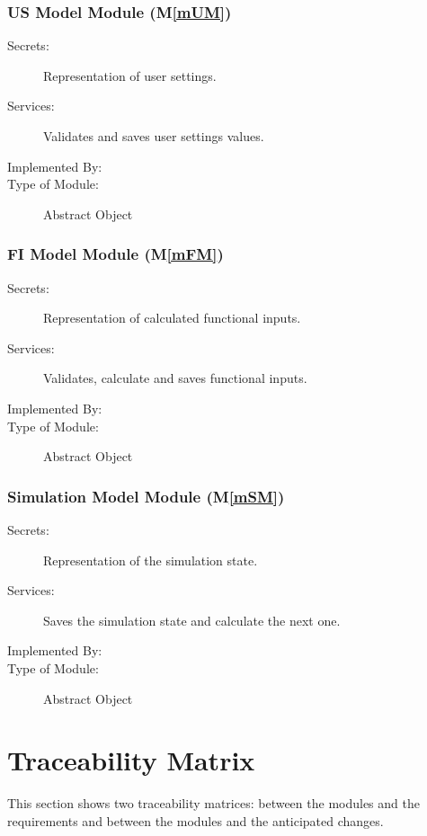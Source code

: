 \documentclass[12pt, titlepage]{article}
\newcommand{\mref}[1]{M\ref{#1}}
\begin{document}
\subsubsection{US Model Module (\mref{mUM})}

\begin{description}
\item[Secrets:]Representation of user settings.
\item[Services:]Validates and saves user settings values.
\item[Implemented By:] \progname
\item[Type of Module:] Abstract Object
\end{description}

\subsubsection{FI Model Module (\mref{mFM})}

\begin{description}
\item[Secrets:]Representation of calculated functional inputs.
\item[Services:]Validates, calculate and saves functional inputs.
\item[Implemented By:] \progname
\item[Type of Module:] Abstract Object
\end{description}

\subsubsection{Simulation Model Module (\mref{mSM})}

\begin{description}
\item[Secrets:]Representation of the simulation state.
\item[Services:]Saves the simulation state and calculate the next one.
\item[Implemented By:] \progname
\item[Type of Module:] Abstract Object
\end{description}

\section{Traceability Matrix} \label{SecTM}

This section shows two traceability matrices: between the modules and the
requirements and between the modules and the anticipated changes.
\end{document}
